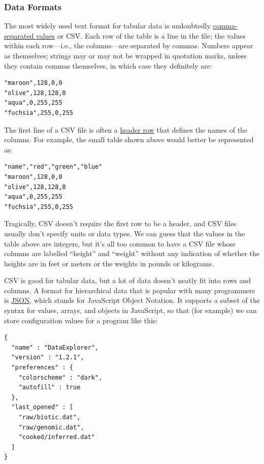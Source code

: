\subsubsection{Data Formats}\label{s:data-formats}

The most widely used text format for tabular data is undoubtedly
\protect\hyperlink{g:csv}{comma-separated values} or CSV. Each row of
the table is a line in the file; the values within each row---i.e., the
columns---are separated by commas. Numbers appear as themselves; strings
may or may not be wrapped in quotation marks, unless they contain commas
themselves, in which case they definitely are:

\begin{verbatim}
"maroon",128,0,0
"olive",128,128,0
"aqua",0,255,255
"fuchsia",255,0,255
\end{verbatim}

The first line of a CSV file is often a
\protect\hyperlink{g:header-row}{header row} that defines the names of
the columns. For example, the small table shown above would better be
represented as:

\begin{verbatim}
"name","red","green","blue"
"maroon",128,0,0
"olive",128,128,0
"aqua",0,255,255
"fuchsia",255,0,255
\end{verbatim}

Tragically, CSV doesn't require the first row to be a header, and CSV
files usually don't specify units or data types. We can guess that the
values in the table above are integers, but it's all too common to have
a CSV file whose columns are labelled ``height'' and ``weight'' without
any indication of whether the heights are in feet or meters or the
weights in pounds or kilograms.

CSV is good for tabular data, but a lot of data doesn't neatly fit into
rows and columns. A format for hierarchical data that is popular with
many programmers is \protect\hyperlink{g:json}{JSON}, which stands for
JavaScript Object Notation. It supports a subset of the syntax for
values, arrays, and objects in JavaScript, so that (for example) we can
store configuration values for a program like this:

\begin{verbatim}
{
  "name" : "DataExplorer",
  "version" : "1.2.1",
  "preferences" : {
    "colorscheme" : "dark",
    "autofill" : true
  },
  "last_opened" : [
    "raw/biotic.dat",
    "raw/genomic.dat",
    "cooked/inferred.dat"
  ]
}
\end{verbatim}

